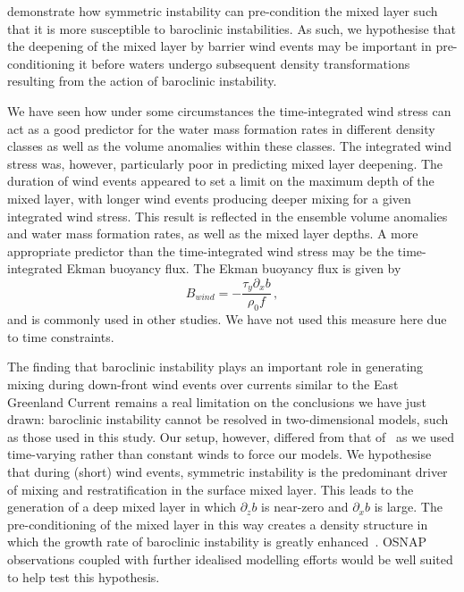 \citet{Haine1998} demonstrate how symmetric instability can pre-condition the mixed layer such that it is more susceptible to baroclinic instabilities. As such, we hypothesise that the deepening of the mixed layer by barrier wind events may be important in pre-conditioning it before waters undergo subsequent density transformations resulting from the action of baroclinic instability.

We have seen how under some circumstances the time-integrated wind stress can act as a good predictor for the water mass formation rates in different density classes as well as the volume anomalies within these classes. The integrated wind stress was, however, particularly poor in predicting mixed layer deepening. The duration of wind events appeared to set a limit on the maximum depth of the mixed layer, with longer wind events producing deeper mixing for a given integrated wind stress. This result is reflected in the ensemble volume anomalies and water mass formation rates, as well as the mixed layer depths. A more appropriate predictor than the time-integrated wind stress may be the time-integrated Ekman buoyancy flux. The Ekman buoyancy flux is given by
\begin{equation}
    B_{wind} = -\frac{\tau_y \partial_x b}{\rho_0 f} \, ,
\end{equation}
and is commonly used in other studies. We have not used this measure here due to time constraints.

The finding that baroclinic instability plays an important role in generating mixing during down-front wind events over currents similar to the East Greenland Current \citep{Spall2016} remains a real limitation on the conclusions we have just drawn: baroclinic instability cannot be resolved in two-dimensional models, such as those used in this study.
Our setup, however, differed from that of~\citet{Spall2016} as we used time-varying rather than constant winds to force our models. We hypothesise that during (short) wind events, symmetric instability is the predominant driver of mixing and restratification in the surface mixed layer. This leads to the generation of a deep mixed layer in which $\partial_z b$ is near-zero and $\partial_x b$ is large. The pre-conditioning of the mixed layer in this way creates a density structure in which the growth rate of baroclinic instability is greatly enhanced~\citep{Eady1949, Haine1998}. OSNAP observations coupled with further idealised modelling efforts would be well suited to help test this hypothesis.